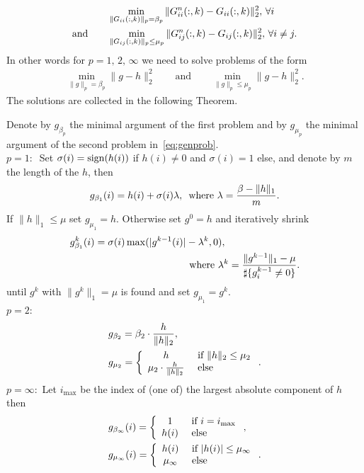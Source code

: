 \documentclass[11pt]{article}
\begin{document}
\begin{align}
&\min_{\|G_{ii}(:,k)\|_p=\beta_p} \|G^n_{ii}(:,k)-G_{ii}(:,k)\|^2_2, \, \forall i \notag \\
\mbox{and}\qquad&\min_{\|G_{ij}(:,k)\|_p\leq \mu_p} \|G^n_{ij}(:,k)-G_{ij}(:,k)\|^2_2, \, \forall i\neq j \notag.
\end{align}
In other words for $p=1,\,2,\, \infty$ we need to solve problems of the form
\begin{align}\label{eq:genprob}
\min_{\|g\|_p=\beta_p} \|g-h\|^2_2 \qquad \mbox{and} \qquad \min_{\|g\|_p\leq \mu_p} \|g-h\|^2_2.
\end{align}
The solutions are collected in the following Theorem.
\begin{Theorem} Denote by $g_{\beta_p}$ the minimal argument of the first problem and by $g_{\mu_p}$ the minimal argument of the second problem in~\eqref{eq:genprob}. \\
$p=1:\:$ Set $\sigma(i)={\operatorname{sign}}(h(i))$ if $h(i)\neq0$ and $\sigma(i)=1$ else, and denote by $m$ the length of the $h$, then
\begin{align}
g_{\beta_1}(i)= h(i) + \sigma(i) \lambda, \, \mbox{ where } \lambda= \frac{\beta-\|h\|_1}{m}.\notag
\end{align}
If $\|h\|_1\leq \mu$ set $g_{\mu_1}=h$. Otherwise set $g^0=h$ and iteratively shrink
\begin{align}
 g^k_{\beta_1}(i)= \sigma(i) \max(|g^{k-1}(i)| &- \lambda^k,0), \notag \\
 & \mbox{ where } \lambda^k= \frac{\|g^{k-1}\|_1-\mu}{\sharp \{g_i^{k-1}\neq 0\}}.\notag
\end{align}
until $g^k$ with $\|g^k\|_1=\mu$ is found and set  $g_{\mu_1}=g^k$.\\
\noindent $p=2:\:$
\begin{align}
&g_{\beta_2}=\beta_2 \cdot \frac{h}{\|h\|_2},  \notag \\
&g_{\mu_2} = \left\{ \begin{array}{cl} 
      h & \mbox{ if } \|h\|_2 \leq \mu_2\\
     \mu_2 \cdot \frac{h}{\|h\|_2}& \mbox{ else} \\
   \end{array} \right. . \notag
\end{align}
\noindent $p=\infty:$ Let $ i_{\max} $ be the index of (one of) the largest absolute component of $h$ then
\begin{align}
&g_{\beta_\infty}(i) = \left\{ \begin{array}{cl} 
     1 & \mbox{ if } i =  i_{\max}\\
     h(i) & \mbox{ else} \\
   \end{array} \right. ,
\notag \\
&g_{\mu_\infty}(i) = \left\{ \begin{array}{cl} 
      h(i) & \mbox{ if } |h(i)| \leq \mu_\infty\\
     \mu_\infty & \mbox{ else} \\
   \end{array} \right. . \notag
\end{align}

\end{Theorem}
\end{document}
